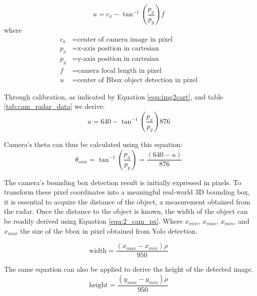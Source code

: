 \begin{equation}\label{equ:img2cart}
u=c_x-\tan^{-1}(\frac{p_x}{p_y})f
\end{equation}
where
\begin{align*}
    c_x &=\text{center of camera image in pixel}\\
    p_x &=\text{x-axis position in cartesian}\\
    p_y &=\text{y-axis position in cartesian}\\
    f &=\text{camera focal length in pixel}\\
    u &=\text{center of Bbox object detection in pixel}
\end{align*}

Through calibration, as indicated by Equation \ref{equ:img2cart}, and table \ref{tab:cam_radar_data} we derive:
\begin{equation}\label{equ:2_img2cart2}
    u=640-\tan^{-1}(\frac{p_x}{p_y})876
\end{equation}

Camera's theta can thus be calculated using this equation:
\begin{equation}\label{equ:2_cam_px}
    \theta_{cam}=
    \tan^{-1}(\frac{p_x}{p_y})=
    \frac
    {(640-u)}
    {876}
\end{equation}


The camera's bounding box detection result is initially expressed in pixels. 
To transform these pixel coordinates into a meaningful real-world 3D bounding box, 
it is essential to acquire the distance of the object, 
a measurement obtained from the radar. 
Once the distance to the object is known, the width of the object can be readily derived using Equation \ref{equ:2_cam_px}.
Where $x_{min}$, $x_{max}$, $x_{min}$, and $x_{max}$ the size of the bbox in pixel obtained from Yolo detection. 

\begin{equation}\label{equ:2_cam_width}
    \text{width}=
    \frac
    {(x_{max}-x_{min})\rho}
    {950}
\end{equation}

The same equation can also be applied to derive the height of the detected image. 
\begin{equation}\label{equ:2_cam_height}
    \text{height}=
    \frac
    {(y_{max}-y_{min})\rho}
    {950}
\end{equation}

\newpage

